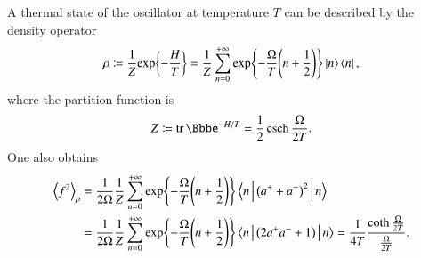 A thermal state of the oscillator at temperature $T$ can be described by the
density operator
\begin{equation}
\rho \coloneqq \frac{1}{Z} {\exp}\mathopen{}\left\{-\frac{H}{T}\right\}\mathclose{} = \frac{1}{Z} 
\sum_{n=0}^{+\infty} {\exp}\mathopen{}\left\{-\frac{\Omega}{T}{\left(n+\frac{1}{2}\right)}\right\}\mathclose{} 
\Ket{n}\Bra{n},
\label{eq:single-thermal-density-mat}
\end{equation}
where the partition function is
\begin{equation}
Z \coloneqq \tr{\ee^{-H/T}} = \frac{1}{2} \csch\frac{\Omega}{2 T}.
\end{equation}
One also obtains
\begin{align}
\abr{f^2}_\rho &= \frac{1}{2\Omega}\frac{1}{Z}\sum_{n=0}^{+\infty}
\cfun{\exp}{-\frac{\Omega}{T}\rbr{n+\frac{1}{2}}}
\Braket{n | \rbr{a^++a^-}^2 | n} \nonumber \\
&= \frac{1}{2\Omega}\frac{1}{Z}\sum_{n=0}^{+\infty}
\cfun{\exp}{-\frac{\Omega}{T}\rbr{n+\frac{1}{2}}}
\Braket{n | \rbr{2a^+a^-+1} | n} %
= \frac{1}{4T} \frac{\coth\frac{\Omega}{2 T}}{\frac{\Omega}{2 T}}.
\label{eq:sho-th-cor-1}
\end{align}

